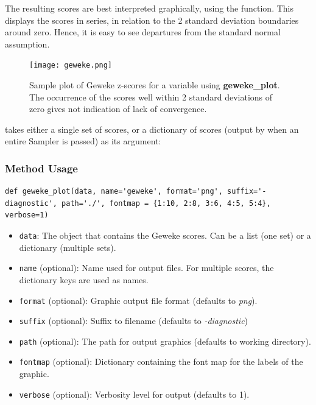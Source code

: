The resulting scores are best interpreted graphically, using the  function. This displays the scores in series, in relation to the 2 standard deviation boundaries around zero. Hence, it is easy to see departures from the standard normal assumption.

\begin{figure}[ht]
\begin{center}
\texttt{[image: geweke.png]}
\caption{Sample plot of Geweke z-scores for a variable using \textbf{geweke_plot}. The occurrence of the scores well within 2 standard deviations of zero gives not indication of lack of convergence.}
\label{fig:geweke}
\end{center}
\end{figure}

 takes either a single set of scores, or a dictionary of scores (output by  when an entire Sampler is passed) as its argument:

\subsubsection*{Method Usage}
\begin{verbatim}
def geweke_plot(data, name='geweke', format='png', suffix='-diagnostic', path='./', fontmap = {1:10, 2:8, 3:6, 4:5, 5:4}, verbose=1)
\end{verbatim}
\begin{itemize}
	
\item \verb=data=: The object that contains the Geweke scores. Can be a list (one set) or a dictionary (multiple sets).

\item \verb=name= (optional): Name used for output files. For multiple scores, the dictionary keys are used as names.

\item \verb=format= (optional): Graphic output file format (defaults to \emph{png}).

\item \verb=suffix= (optional): Suffix to filename (defaults to \emph{-diagnostic})

\item \verb=path= (optional): The path for output graphics (defaults to working directory).

\item \verb=fontmap= (optional): Dictionary containing the font map for the labels of the graphic.

\item \verb=verbose= (optional): Verbosity level for output (defaults to 1).
\end{itemize}

